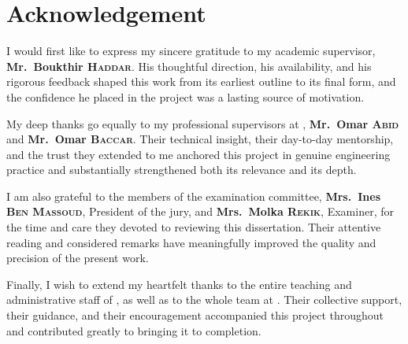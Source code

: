 \chapter*{Acknowledgement}
\thispagestyle{MyStyle}

I would first like to express my sincere gratitude to my academic supervisor, \textbf{Mr.~Boukthir \textsc{Haddar}}. His thoughtful direction, his availability, and his rigorous feedback shaped this work from its earliest outline to its final form, and the confidence he placed in the project was a lasting source of motivation.\par
\vspace{0.3cm}
My deep thanks go equally to my professional supervisors at \hostCompany, \textbf{Mr.~Omar \textsc{Abid}} and \textbf{Mr.~Omar \textsc{Baccar}}. Their technical insight, their day-to-day mentorship, and the trust they extended to me anchored this project in genuine engineering practice and substantially strengthened both its relevance and its depth.\par
\vspace{0.3cm}
I am also grateful to the members of the examination committee, \textbf{Mrs.~Ines \textsc{Ben Massoud}}, President of the jury, and \textbf{Mrs.~Molka \textsc{Rekik}}, Examiner, for the time and care they devoted to reviewing this dissertation. Their attentive reading and considered remarks have meaningfully improved the quality and precision of the present work.\par
\vspace{0.3cm}
Finally, I wish to extend my heartfelt thanks to the entire teaching and administrative staff of \ENETCOM, as well as to the whole team at \hostCompany. Their collective support, their guidance, and their encouragement accompanied this project throughout and contributed greatly to bringing it to completion.\par
